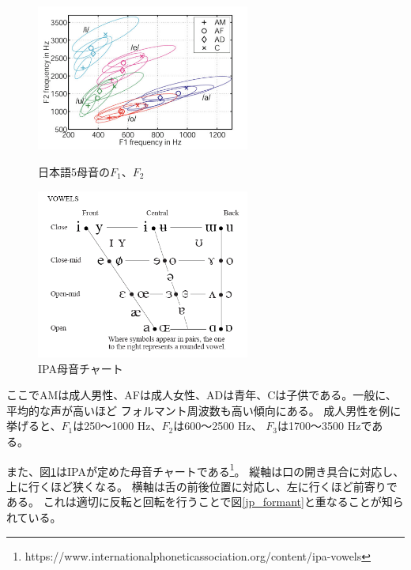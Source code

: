 \documentclass[10.5ptj,a4j,dvipdfmx,uplatex, oneside, openany, report]{jsbook}%
\begin{document}
\begin{figure}[thbp]
    \begin{minipage}{0.5\hsize}
        \begin{center}
            \includegraphics[clip,width=7.0cm]{5母音.png}
            \caption{日本語5母音の$F_1$、$F_2$\cite{japanese_vowels}}
            \label{jp_formant}
        \end{center}
    \end{minipage}
    \begin{minipage}{0.5\hsize}
        \begin{center}
            \includegraphics[clip,width=7.0cm]{vowels.png}
            \caption{IPA母音チャート}
            \label{fig:vowels}
        \end{center}
    \end{minipage}
\end{figure}

ここでAMは成人男性、AFは成人女性、ADは青年、Cは子供である。一般に、平均的な声が高いほど
フォルマント周波数も高い傾向にある。
成人男性を例に挙げると、$F_1$は250〜1000 \si{Hz}、$F_2$は600〜2500 \si{Hz}、
$F_3$は1700〜3500 \si{Hz}である\cite{science}。


また、図\ref{fig:vowels}はIPAが定めた母音チャートである\footnote{https://www.internationalphoneticassociation.org/content/ipa-vowels}。
縦軸は口の開き具合に対応し、上に行くほど狭くなる。
横軸は舌の前後位置に対応し、左に行くほど前寄りである。
これは適切に反転と回転を行うことで図\ref{jp_formant}と重なることが知られている。
\end{document}
